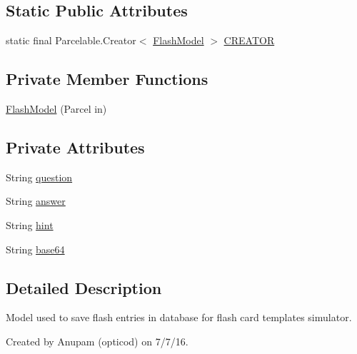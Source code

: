 \subsection*{Static Public Attributes}
\begin{DoxyCompactItemize}
\item 
static final Parcelable.\+Creator$<$ \hyperlink{classorg_1_1buildmlearn_1_1learnwithflashcards_1_1data_1_1FlashModel}{Flash\+Model} $>$ \hyperlink{classorg_1_1buildmlearn_1_1learnwithflashcards_1_1data_1_1FlashModel_a3ddafc448f054610541a3f420012aa23}{C\+R\+E\+A\+T\+OR}
\end{DoxyCompactItemize}
\subsection*{Private Member Functions}
\begin{DoxyCompactItemize}
\item 
\hyperlink{classorg_1_1buildmlearn_1_1learnwithflashcards_1_1data_1_1FlashModel_ab85065465c415e12bd14a08b13f27fae}{Flash\+Model} (Parcel in)
\end{DoxyCompactItemize}
\subsection*{Private Attributes}
\begin{DoxyCompactItemize}
\item 
String \hyperlink{classorg_1_1buildmlearn_1_1learnwithflashcards_1_1data_1_1FlashModel_a037914c8e0f5866fa6989f498bf41692}{question}
\item 
String \hyperlink{classorg_1_1buildmlearn_1_1learnwithflashcards_1_1data_1_1FlashModel_a84d3c1d0f2e4fce7edf8675a26dce200}{answer}
\item 
String \hyperlink{classorg_1_1buildmlearn_1_1learnwithflashcards_1_1data_1_1FlashModel_a3545eb9b2046dca7d26e34e56c8b800c}{hint}
\item 
String \hyperlink{classorg_1_1buildmlearn_1_1learnwithflashcards_1_1data_1_1FlashModel_a457482a150e687d6d186227a4cedc5a3}{base64}
\end{DoxyCompactItemize}


\subsection{Detailed Description}
Model used to save flash entries in database for flash card template\textquotesingle{}s simulator. 

Created by Anupam (opticod) on 7/7/16. 

